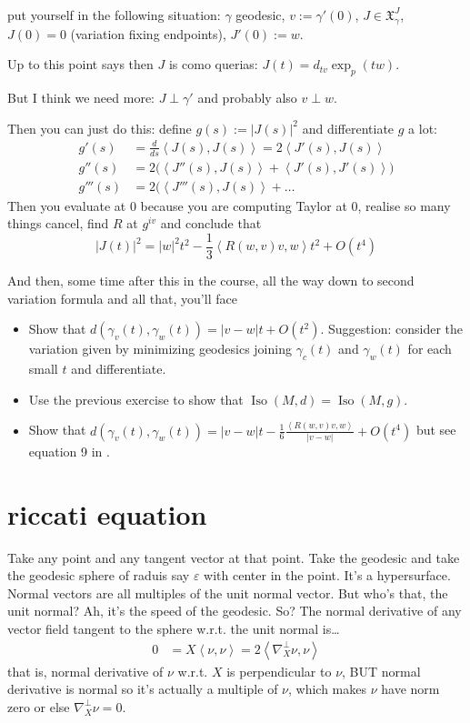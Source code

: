 put yourself in the following situation: \(\gamma\) geodesic, \(v:=\gamma'(0)\), \(J \in \mathfrak{X}^J_\gamma\), \(J(0)=0\) (variation fixing endpoints), \(J'(0):=w\).

Up to this point \cite{au} says then \(J\) is como querias: \(J(t)=d_{tv}\operatorname{exp}_p(tw)\).

But I think we need more: \(J \perp \gamma'\) and probably also \(v \perp w\).

Then you can just do this: define \(g(s):=|J(s)|^2\) and differentiate \(g\) a lot:
\begin{align*}
g'(s)&=\frac{d}{ds}\left<J(s),J(s)\right>=2 \left<J'(s),J(s)\right>\\
g''(s)&=2\Big(\left<J''(s),J(s)\right>+\left<J'(s),J'(s)\right>\Big)\\
g'''(s)&=2 \Big(\left< J'''(s),J(s)\right>+\ldots
\end{align*}
Then you evaluate at \(0\) because you are computing Taylor at 0, realise so many things cancel, find \(R\) at \(g^{iv}\) and conclude that
\[|J(t)|^2=|w|^2t^2-\frac{1}{3}\left<R(w,v)v,w\right>t^2+O(t^4)\]

And then, some time after this in the course, all the way down to second variation formula and all that, you'll face
\begin{exercise}\leavevmode
\begin{itemize}
\item Show that \(d(\gamma_v(t),\gamma_w(t))=|v-w|t+O(t^2)\). Suggestion: consider the variation given by minimizing geodesics joining \(\gamma_c(t)\) and \(\gamma_w(t)\) for each small \(t\) and differentiate.
\item Use the previous exercise to show that \(\operatorname{Iso}(M,d)=\operatorname{Iso}(M,g)\).
\item Show that \(d(\gamma_v(t),\gamma_w(t))=|v-w|t-\frac{1}{6}\frac{\left<R(w,v)v,w\right>}{|v-w|}+O(t^4)\) but see equation 9 in \cite{mey}.
\end{itemize}
\end{exercise}


\section{riccati equation}

Take any point and any tangent vector at that point. Take the geodesic and take the geodesic sphere of raduis say \(\varepsilon\) with center in the point. It's a hypersurface. Normal vectors are all multiples of the unit normal vector. But who's that, the unit normal? Ah, it's the speed of the geodesic. So? The normal derivative of any vector field tangent to the sphere w.r.t. the unit normal is…
\begin{align*}
0&=X\left<\nu,\nu\right>=2\left<\nabla^\perp_X \nu,\nu\right>
\end{align*}
that is, normal derivative of \(\nu\) w.r.t. \(X\) is perpendicular to \(\nu\), BUT normal derivative is normal so it's actually a multiple of \(\nu\), which makes \(\nu\) have norm zero or else \(\nabla^\perp_X \nu=0\).

